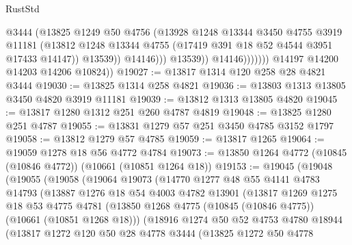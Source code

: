 \begin{lexlean}{RustStd}
\begin{coremodule}
                                @3444
                                (@13825
                                  @1249
                                  @50
                                  @4756
                                  (@13928
                                    @1248
                                    @13344
                                    @3450
                                    @4755
                                    @3919
                                    @11181
                                    (@13812
                                      @1248
                                      @13344
                                      @4755
                                      (@17419 @391 @18 @52 @4544 @3951 @17433 @14147))
                                    @13539))
                                @14146)))
                          @13539))
                      @14146)))))))
        @14197
        @14200
        @14203
        @14206
        @10824))
@19027 := @13817 @1314 @120 @258 @28 @4821 @3444
@19030 := @13825 @1314 @258 @4821
@19036 := @13803 @1313 @13805 @3450 @4820 @3919 @11181
@19039 := @13812 @1313 @13805 @4820
@19045 := @13817 @1280 @1312 @251 @260 @4787 @4819
@19048 := @13825 @1280 @251 @4787
@19055 := @13831 @1279 @57 @251 @3450 @4785 @3152 @1797
@19058 := @13812 @1279 @57 @4785
@19059 := @13817 @1265
@19064 := @19059 @1278 @18 @56 @4772 @4784
@19073 := @13850 @1264 @4772 (@10845 (@10846 @4772)) (@10661 (@10851 @1264 @18))
@19153 := @19045
    (@19048
      (@19055
        (@19058
          (@19064
            @19073
            (@14770
              @1277
              @48
              @55
              @4141
              @4783
              @14793
              (@13887
                @1276
                @18
                @54
                @4003
                @4782
                @13901
                (@13817
                  @1269
                  @1275
                  @18
                  @53
                  @4775
                  @4781
                  (@13850 @1268 @4775 (@10845 (@10846 @4775)) (@10661 (@10851 @1268 @18)))
                  (@18916
                    @1274
                    @50
                    @52
                    @4753
                    @4780
                    @18944
                    (@13817
                      @1272
                      @120
                      @50
                      @28
                      @4778
                      @3444
                      (@13825
                        @1272
                        @50
                        @4778

\end{coremodule}
\end{lexlean}
